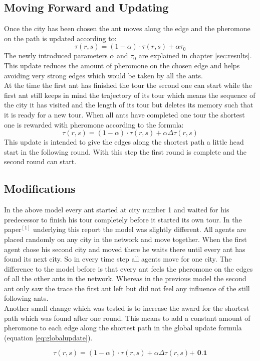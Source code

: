 \subsection{Moving Forward and Updating}
Once the city has been chosen the ant moves along the edge and the pheromone on the path is updated according to:
\begin{equation}
\tau (r,s) = (1-\alpha)\cdot \tau(r,s) + \alpha \tau_0
\label{eq:loctauupdate}
\end{equation}
The newly introduced parameters $\alpha$ and $\tau_0$ are explained in chapter \ref{sec:results}. This update reduces the amount of pheromone on the chosen edge and helps avoiding very strong edges which would be taken by all the ants. \\
At the time the first ant has finished the tour the second one can start while the first ant still keeps in mind the trajectory of its tour which means the sequence of the city it has visited and the length of its tour but deletes its memory such that it is ready for a new tour. When all ants have completed one tour the shortest one is rewarded with pheromone according to the formula:
\begin{equation}
\tau(r,s) = (1-\alpha)\cdot \tau(r,s) + \alpha \Delta \tau(r,s)
\label{eq:globalupdate}
\end{equation}
This update is intended to give the edges along the shortest path a little head start in the following round. With this step the first round is complete and the second round can start.

\subsection{Modifications}

In the above model every ant started at city number 1 and waited for his predecessor to finish his tour completely before it started its own tour. In the paper$^{[1]}$ underlying this report the model was slightly different. All agents are placed randomly on any city in the network and move together. When the first agent chose his second city and moved there he waits there until every ant has found its next city. So in every time step all agents move for one city. The difference to the model before is that every ant feels the pheromone on the edges of all the other ants in the network. Whereas in the previous model the second ant only saw the trace the first ant left but did not feel any influence of the still following ants. \\
Another small change which was tested is to increase the award for the shortest path which was found after one round. This means to add a constant amount of pheromone to each edge along the shortest path in the global update formula (equation \ref{eq:globalupdate}).

\begin{equation}
\tau(r,s) = (1-\alpha)\cdot \tau(r,s) + \alpha \Delta \tau(r,s) \textbf{+ 0.1}
\label{eq:globalupdate2}
\end{equation}